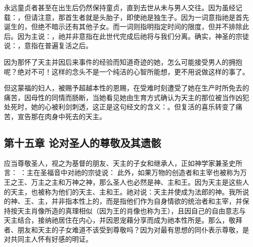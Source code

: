 永远童贞者甚至在出生后仍然保持童贞，直到去世从未与男人交往。因为虽经记载：，但请注意，那首生者就是头胎子，即使祂是独生子。因为一词意指祂是首先诞生的，但绝不暗示还有其他子女。而一词则指明指定时间的限度，但并不排除此后。因为主说：，祂并非意指在此世代完成后祂将与我们分离。确实，神圣的宗徒说：，意指在普遍复活之后。\par

因为那怀了天主并因后来事件的经验而知道奇迹的她，怎么可能接受男人的拥抱呢？绝对不可！这样的念头不是一个纯洁的心智所能想，更不用说做这样的事了。\par

但这蒙福的妇人，被赐予超越本性的恩赐，在受难时刻遭受了她在生产时所免去的痛苦，因母性的同情而肠断，当她看见她由生育方式确认为天主的那位被当作凶犯处死时，她的心被利剑刺透，这正是这句经文的含义：。但复活的喜乐转变了痛苦，宣告那在肉身中死去的天主。\par


\subsection{第十五章 论对圣人的尊敬及其遗骸}

应当尊敬圣人，视之为基督的朋友、天主的子女和继承人，正如神学家兼圣史所言： ：主在圣福音中对祂的宗徒说： 此外，如果万物的创造者和主宰也被称为万王之王、万主之主和万神之神，那么圣人也必然是神、主和王。因为天主是这些人的天主，也被称为他们的天主、主和王。祂对说：天主并使成为法郎的神。我所说的神、王、主，并非指本性上的，而是指他们作为自身情欲的统治者和主宰，并保持按天主肖像所造的真理相似（因为王的肖像也称为王），且因自己的自由意志与天主结合，接纳祂居住在内心，并因恩宠藉分享而成为祂本性所是。那么，敬拜者、朋友和天主的子女难道不该受到尊敬吗？因为对最有思想的同仆表示尊敬，是对共同主人怀有好感的明证。\par

